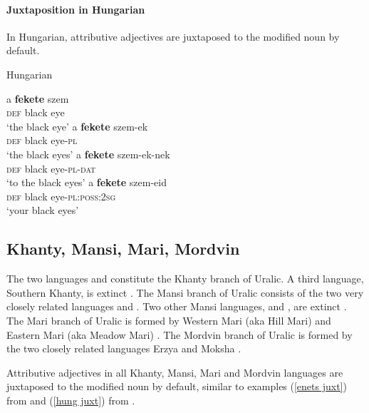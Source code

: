 \paragraph*{Juxtaposition in Hungarian}
In Hungarian, attributive adjectives are juxtaposed to the modified noun by default.
\begin{exe}
\label{hung juxt}
\ex \rm{Hungarian \citep[41]{hall1938}}
\begin{xlist}
\ex 
\gll	a \textbf{fekete} szem\\
	\textsc{def} black eye\\
\glt	‘the black eye’
\ex	
\gll	a \textbf{fekete} szem-ek\\
	\textsc{def} black eye-\textsc{pl}\\
\glt	‘the black eyes’
\ex
\gll	a \textbf{fekete} szem-ek-nek\\
	\textsc{def} black eye-\textsc{pl}-\textsc{dat}\\
\glt	‘to the black eyes’
\ex
\gll	a \textbf{fekete} szem-eid\\
	\textsc{def} black eye-\textsc{pl:poss:2sg}\\
\glt	‘your black eyes’
\end{xlist}
\end{exe}

\subsection{Khanty, Mansi, Mari, Mordvin}
The two languages  and  constitute the Khanty branch of Uralic. A third language, Southern Khanty, is extinct \citep[231]{salminen2007}. The Mansi branch of Uralic consists of the two very closely related languages  and . Two other Mansi languages,  and , are extinct \citep[231]{salminen2007}. The Mari branch of Uralic is formed by Western Mari (aka Hill Mari) and Eastern Mari (aka Meadow Mari) \citep[231]{salminen2007}. The Mordvin branch of Uralic is formed by the two closely related languages Erzya and Moksha  \citep[231]{salminen2007}.

Attributive adjectives in all Khanty, Mansi, Mari and Mordvin languages are juxtaposed to the modified noun by default, similar to examples (\ref{enets juxt}) from  and (\ref{hung juxt}) from .

